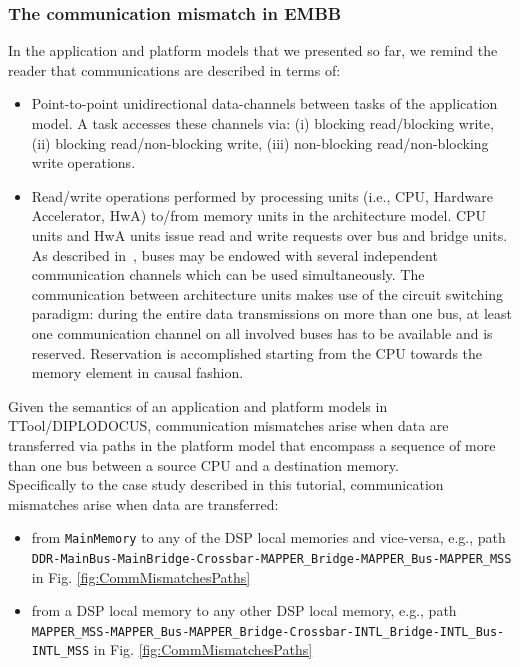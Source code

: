 \documentclass{llncs}
\begin{document}
\subsubsection{The communication mismatch in EMBB}
%
In the application and platform models that we presented so far, we remind the reader that communications are
described in terms of:
%
\begin{itemize}
	\item Point-to-point unidirectional data-channels between tasks of the application model. A task accesses these
        channels via: (i) blocking read/blocking write, (ii) blocking read/non-blocking write, (iii) non-blocking
        read/non-blocking write operations.
	\item Read/write operations performed by processing units (i.e., CPU, Hardware Accelerator, HwA) to/from memory
        units in the architecture model. CPU units and HwA units issue read and write requests over bus and bridge
        units. As described in~\cite{Knorreck11}, buses may be endowed with several independent communication channels
        which can be used simultaneously. The communication between architecture units makes use of the circuit
        switching paradigm: during the entire data transmissions on more than one bus, at least one communication
        channel on all involved buses has to be available and is reserved. Reservation is accomplished starting from the
        CPU towards the memory element in causal fashion.
\end{itemize}
%
Given the semantics of an application and platform models in TTool\-/DI\-PLO\-DO\-CUS, communication mismatches arise
when data are transferred via paths in the platform model that encompass a sequence of more than one bus between a
source CPU and a destination memory.\\
%
Specifically to the case study described in this tutorial, communication mismatches arise when data are transferred:
%
\begin{itemize}
	\item from \texttt{MainMemory} to any of the DSP local memories and vice-versa, e.g., path
	\texttt{DDR\--MainBus\--MainBridge\--Crossbar\--MAPPER\_Bridge\--MAPPER\_Bus\--MAPPER\_MSS} in Fig. \ref{fig:CommMismatchesPaths}
	\item from a DSP local memory to any other DSP local memory, e.g., path
	\texttt{MAPPER\_MSS\--MAPPER\_Bus\--MAPPER\_Bridge\--Crossbar\--INTL\_Bridge\--INTL\_Bus\--INTL\_MSS} in Fig. \ref{fig:CommMismatchesPaths}
\end{itemize}
\end{document}
